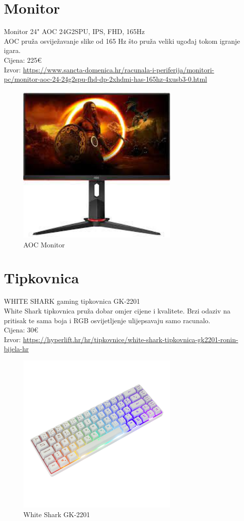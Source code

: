 \documentclass{report}
\begin{document}
\chapter{Monitor}
Monitor 24" AOC 24G2SPU, IPS, FHD, 165Hz
\\AOC pruža osviježavanje slike od 165 Hz što pruža veliki ugođaj tokom igranje igara.
\\Cijena: 225€
\\Izvor:  \url{https://www.sancta-domenica.hr/racunala-i-periferija/monitori-pc/monitor-aoc-24-24g2spu-fhd-dp-2xhdmi-has-165hz-4xusb3-0.html}
\begin{figure}[h]
\includegraphics[width=8cm]{slike/monitor.jpg}
\caption{AOC Monitor}
\end{figure}

\chapter{Tipkovnica}
WHITE SHARK gaming tipkovnica GK-2201
\\White Shark tipkovnica pruža dobar omjer cijene i kvalitete. Brzi odaziv na pritisak te sama boja i RGB osvijetljenje ulijepsavaju samo racunalo.
\\Cijena: 30€
\\Izvor:  \url{https://hyperlift.hr/hr/tipkovnice/white-shark-tipkovnica-gk2201-ronin-bijela-hr}
\begin{figure}[h]
\includegraphics[width=8cm]{slike/tipkovnica.jpg}
\caption{White Shark GK-2201}
\end{figure}
\end{document}

